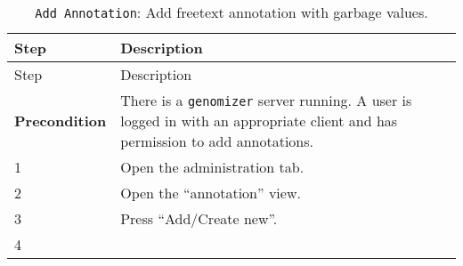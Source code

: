 \begin{longtable}[c]{@{}ll@{}}
\caption{\texttt{Add\ Annotation}: Add freetext annotation with garbage
values.}\tabularnewline
\toprule
\begin{minipage}[b]{0.31\columnwidth}\raggedright\strut
Step
\strut\end{minipage} &
\begin{minipage}[b]{0.63\columnwidth}\raggedright\strut
Description
\strut\end{minipage}\tabularnewline
\midrule
\endfirsthead
\toprule
\begin{minipage}[b]{0.31\columnwidth}\raggedright\strut
Step
\strut\end{minipage} &
\begin{minipage}[b]{0.63\columnwidth}\raggedright\strut
Description
\strut\end{minipage}\tabularnewline
\midrule
\endhead
\begin{minipage}[t]{0.31\columnwidth}\raggedright\strut
\textbf{Precondition}
\strut\end{minipage} &
\begin{minipage}[t]{0.63\columnwidth}\raggedright\strut
There is a \texttt{genomizer} server running. A user is logged in with
an appropriate client and has permission to add annotations.
\strut\end{minipage}\tabularnewline
\begin{minipage}[t]{0.31\columnwidth}\raggedright\strut
1
\strut\end{minipage} &
\begin{minipage}[t]{0.63\columnwidth}\raggedright\strut
Open the administration tab.
\strut\end{minipage}\tabularnewline
\begin{minipage}[t]{0.31\columnwidth}\raggedright\strut
2
\strut\end{minipage} &
\begin{minipage}[t]{0.63\columnwidth}\raggedright\strut
Open the ``annotation'' view.
\strut\end{minipage}\tabularnewline
\begin{minipage}[t]{0.31\columnwidth}\raggedright\strut
3
\strut\end{minipage} &
\begin{minipage}[t]{0.63\columnwidth}\raggedright\strut
Press ``Add/Create new''.
\strut\end{minipage}\tabularnewline
\begin{minipage}[t]{0.31\columnwidth}\raggedright\strut
4
\strut\end{minipage} &

\end{longtable}
